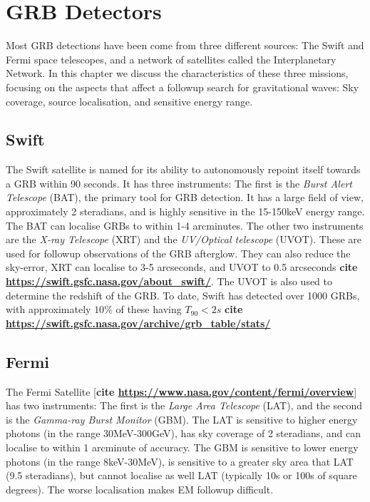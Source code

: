 \documentclass[11pt]{cuthesis}
\begin{document}
\section{GRB Detectors} \label{sec:grb detectors}
Most GRB detections have been come from three different sources: The Swift and Fermi space telescopes, and a network of satellites called the Interplanetary Network. In this chapter we discuss the characteristics of these three missions, focusing on the aspects that affect a followup search for gravitational waves: Sky coverage, source localisation, and sensitive energy range. 

\subsection{Swift}
The Swift satellite is named for its ability to autonomously repoint itself towards a GRB within 90 seconds. It has three instruments: The first is the \textit{Burst Alert Telescope} (BAT), the primary tool for GRB detection. It has a large field of view, approximately 2 steradians, and is highly sensitive in the 15-150keV energy range. The BAT can localise GRBs to within 1-4 arcminutes. The other two instruments are the \textit{X-ray Telescope} (XRT) and the \textit{UV/Optical telescope} (UVOT). These are used for followup observations of the GRB afterglow. They can also reduce the sky-error, XRT can localise to 3-5 arcseconds, and UVOT to 0.5 arcseconds \textbf{cite \url{https://swift.gsfc.nasa.gov/about_swift/}}. The UVOT is also used to determine the redshift of the GRB. To date, Swift has detected over 1000 GRBs, with approximately $10\%$ of these having $T_{90}<2s$ \textbf{cite \url{https://swift.gsfc.nasa.gov/archive/grb_table/stats/}}

\subsection{Fermi}
The Fermi Satellite [\textbf{cite \url{https://www.nasa.gov/content/fermi/overview}}] has two instruments: The first is the \textit{Large Area Telescope} (LAT), and the second is the \textit{Gamma-ray Burst Monitor} (GBM). The LAT is sensitive to higher energy photons (in the range 30MeV-300GeV), has sky coverage of  2 steradians, and can localise to within 1 arcminute of accuracy. The GBM is sensitive to lower energy photons (in the range 8keV-30MeV), is sensitive to a greater sky area that LAT (9.5 steradians), but cannot localise as well LAT (typically 10s or 100s of square degrees). The worse localisation makes EM followup difficult. 
\end{document}
